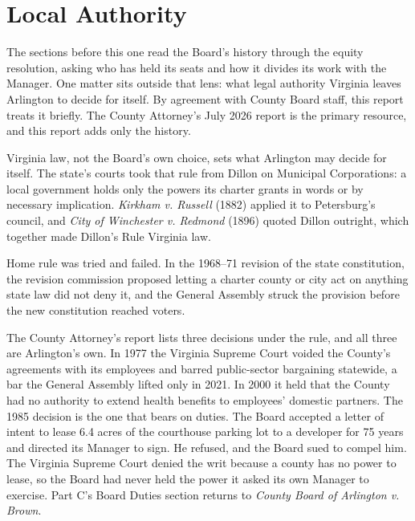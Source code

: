 \section{Local Authority}\label{sec:legal}

The sections before this one read the Board's history through the equity
resolution, asking who has held its seats and how it divides its work with the
Manager. One matter sits outside that lens: what legal authority Virginia leaves
Arlington to decide for itself. By agreement with County Board staff, this report
treats it briefly. The County Attorney's July 2026 report is the primary
resource, and this report adds only the history.\autocite{samuel2026}

Virginia law, not the Board's own choice, sets what Arlington may decide for
itself. The state's courts took that rule from Dillon on Municipal Corporations: a
local government holds only the powers its charter grants in words or by
necessary implication. \textit{Kirkham v. Russell} (1882) applied it to
Petersburg's council, and \textit{City of Winchester v. Redmond} (1896) quoted
Dillon outright, which together made Dillon's Rule Virginia
law.\autocite{kirkhamvrussell1882,winchestervredmond1896}\fnsep\autocite[195--96]{schragger2022}


Home rule was tried and failed. In the 1968--71 revision of the state
constitution, the revision commission proposed letting a charter county or city
act on anything state law did not deny it, and the General Assembly struck the
provision before the new constitution reached voters.\autocite[200]{schragger2022}

The County Attorney's report lists three decisions under the rule, and all three
are Arlington's own. In 1977 the Virginia Supreme Court voided the County's
agreements with its employees and barred public-sector bargaining statewide, a
bar the General Assembly lifted only in
2021.\autocite{commonwealthvarlington1977} In 2000 it held that the County had no
authority to extend health benefits to employees' domestic
partners.\autocite{arlingtonvwhite2000} The 1985 decision is the one that bears on
duties. The Board accepted a letter of intent to lease 6.4 acres of the courthouse
parking lot to a developer for 75 years and directed its Manager to sign. He
refused, and the Board sued to compel him. The Virginia Supreme Court denied the
writ because a county has no power to lease, so the Board had never held the
power it asked its own Manager to exercise.\autocite{brownvarlington1985} Part C's
Board Duties section returns to \textit{County Board of Arlington v. Brown}.

